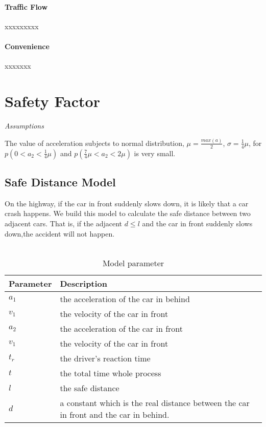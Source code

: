 \paragraph{Traffic Flow} xxxxxxxxx

\paragraph{Convenience} xxxxxxx


\section{Safety Factor}

\emph{Assumptions}

The value of acceleration subjects to normal distribution, 
$\mu = \frac{max(a)}{2}$, $\sigma = \frac{1}{4}\mu$, for 
$p(0 < a_2 < \frac{1}{4} \mu)$ and 
$p(\frac{7}{4} \mu < a_2 < 2\mu)$ is very small.

\subsection{Safe Distance Model}

On the highway, if the car in front suddenly slows down, 
it is likely that a car crash happens. We build this model 
to calculate the safe distance between two adjacent cars. 
That is, if the adjacent $d \leq l$ and the car in front 
suddenly slows down,the accident will not happen.\\ \\

\begin{table}
\centering
\begin{tabular}{ll}
\hline
Parameter & Description\\
\hline
$a_1$ & the acceleration of the  car in behind \\
$v_1$ & the velocity of the  car in front \\
$a_2$ & the acceleration of the car in front \\
$v_1$ & the velocity of the  car in front \\
$t_r$ & the driver's reaction time \\
$t$ & the total time whole process \\
$l$ & the safe distance \\
$d$ & a constant which is the real distance between the 
car in front and the car in behind.\\
\hline
\end{tabular}
\caption{Model parameter}
\end{table}

